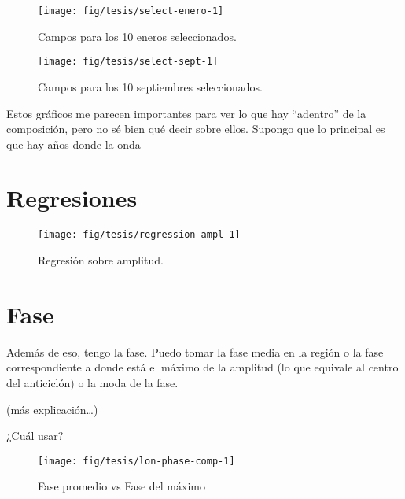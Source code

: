 \documentclass[spanish,a4paper]{book}
\begin{document}
\begin{figure}

{\centering \texttt{[image: fig/tesis/select-enero-1]} 

}

\caption{Campos para los 10 eneros seleccionados.}\label{fig:select-enero}
\end{figure}

\begin{figure}

{\centering \texttt{[image: fig/tesis/select-sept-1]} 

}

\caption{Campos para los 10 septiembres seleccionados.}\label{fig:select-sept}
\end{figure}

Estos gráficos me parecen importantes para ver lo que hay ``adentro'' de
la composición, pero no sé bien qué decir sobre ellos. Supongo que lo
principal es que hay años donde la onda

\section{Regresiones}\label{regresiones}

\begin{figure}

{\centering \texttt{[image: fig/tesis/regression-ampl-1]} 

}

\caption{Regresión sobre amplitud.}\label{fig:regression-ampl}
\end{figure}

\section{Fase}\label{fase}

Además de eso, tengo la fase. Puedo tomar la fase media en la región o
la fase correspondiente a donde está el máximo de la amplitud (lo que
equivale al centro del anticiclón) o la moda de la fase.

(más explicación\ldots{})

¿Cuál usar?

\begin{figure}

{\centering \texttt{[image: fig/tesis/lon-phase-comp-1]} 

}

\caption{Fase promedio vs Fase del máximo}\label{fig:lon-phase-comp}
\end{figure}
\end{document}
